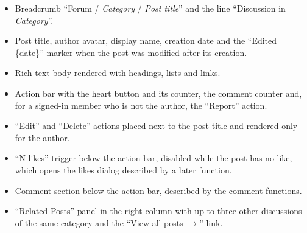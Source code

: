\begin{itemize}[leftmargin=1.6em,topsep=3pt,itemsep=2pt,parsep=0pt,label=$\bullet$]
      \item Breadcrumb ``Forum / \textit{Category} / \textit{Post title}'' and the line
            ``Discussion in \textit{Category}''.
      \item Post title, author avatar, display name, creation date and the ``Edited
            \{date\}'' marker when the post was modified after its creation.
      \item Rich-text body rendered with headings, lists and links.
      \item Action bar with the heart button and its counter, the comment counter and, for
            a signed-in member who is not the author, the ``Report'' action.
      \item ``Edit'' and ``Delete'' actions placed next to the post title and rendered only for the
            author.
      \item ``N likes'' trigger below the action bar, disabled while the post has no like, which opens
            the likes dialog described by a later function.
      \item Comment section below the action bar, described by the comment functions.
      \item ``Related Posts'' panel in the right column with up to three other discussions of the
            same category and the ``View all posts $\rightarrow$'' link.
\end{itemize}

